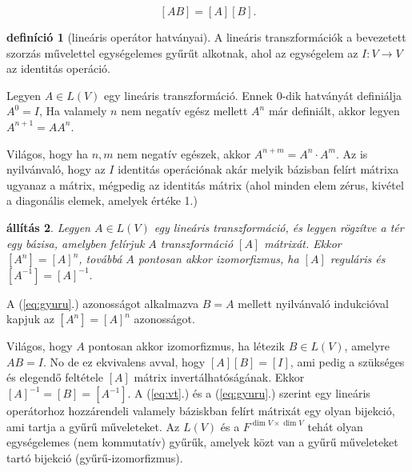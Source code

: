 \documentclass[9pt, a4paper, showtrims]{memoir}
\makeatletter
\renewenvironment{proof}[1][\proofname]
    {\par\pushQED{\qed}%
    \normalfont \topsep6\p@\@plus6\p@\relax
    \trivlist
    \item[\hskip\labelsep
        \itshape
    #1\@addpunct{:}]\ignorespaces}
    {\popQED\endtrivlist\@endpefalse}
\theoremstyle{plain}
\newtheorem{proposition}{állítás}[chapter]
\theoremstyle{remark}
\theoremstyle{definition}
\newtheorem{definition}[proposition]{definíció}
\makeatother
\begin{document}
\begin{equation}\label{eq:gyuru}
    [AB]=[A][B].
\end{equation}
\begin{definition}[lineáris operátor hatványai]
    A lineáris transzformációk a bevezetett szorzás művelettel egységelemes gyűrűt alkotnak,
    ahol az egységelem az
    $I:V\to V$ az identitás operáció.

    Legyen $A\in L\left( V \right)$ egy lineáris transzformáció.
    Ennek $0$-dik hatványát definiálja $A^0=I$,
    Ha valamely $n$ nem negatív egész mellett $A^n$ már definiált,
    akkor legyen $A^{n+1}=AA^n$.
\end{definition}
Világos, hogy ha $n,m$ nem negatív egészek, akkor $A^{n+m}=A^n\cdot A^m$.
Az is nyilvánvaló, hogy az $I$ identitás operációnak akár melyik bázisban felírt mátrixa ugyanaz a mátrix,
mégpedig az identitás mátrix (ahol minden elem zérus, kivétel a diagonális elemek, amelyek értéke 1.)
\begin{proposition}
    Legyen $A\in L\left( V \right)$ egy lineáris transzformáció, és legyen rögzítve a tér egy bázisa,
    amelyben felírjuk $A$ transzformáció $[A]$ mátrixát.
    Ekkor 
    \(
    \left[ A^n \right]=\left[ A \right]^n
    \),
    továbbá $A$ pontosan akkor izomorfizmus, ha $[A]$ reguláris és 
    \begin{math}
        \left[ A^{-1} \right]
        =
        \left[ A \right]^{-1}.
    \end{math}
\end{proposition}
\begin{proof}
    A (\ref{eq:gyuru}.) azonosságot alkalmazva $B=A$ mellett nyilvánvaló indukcióval kapjuk az
    $\left[ A^n \right]=\left[ A \right]^n$
    azonosságot.

    Világos, hogy $A$ pontosan akkor izomorfizmus, 
    ha létezik $B\in L\left( V \right)$, amelyre $AB=I$.
    No de ez ekvivalens avval, hogy $[A][B]=[I]$, ami pedig a szükséges és elegendő feltétele 
    $[A]$ mátrix invertálhatóságának.
    Ekkor $[A]^{-1}=[B]=\left[ A^{-1} \right]$.
\end{proof}
A (\ref{eq:vt}.) és a (\ref{eq:gyuru}.) szerint egy lineáris operátorhoz hozzárendeli valamely báziskban
felírt mátrixát egy olyan bijekció, ami tartja a gyűrű műveleteket.
Az $L\left( V \right)$ és a $F^{\dim V\times \dim V}$ tehát olyan egységelemes (nem kommutatív) gyűrűk,
amelyek közt van a gyűrű műveleteket tartó bijekció (gyűrű-izomorfizmus).
\end{document}
